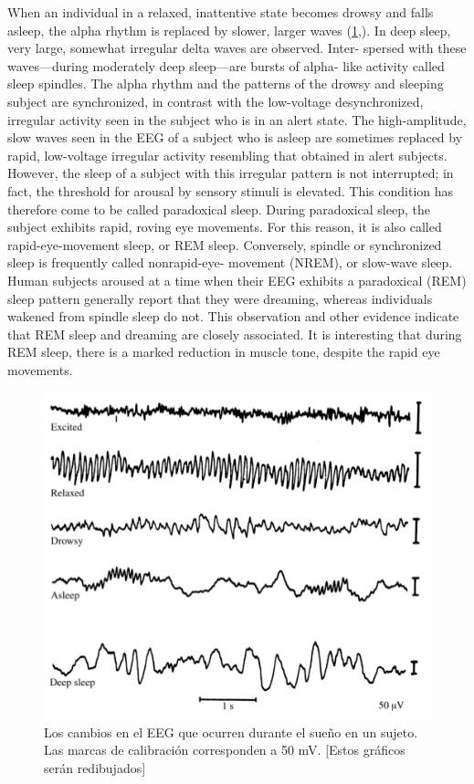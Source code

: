 
When an individual in a relaxed, inattentive state becomes drowsy and falls
asleep, the alpha rhythm is replaced by slower, larger waves 
(\ref{ritmosEEG},\cite{Jasper42}). In
deep sleep, very large, somewhat irregular delta waves are observed. Inter-
spersed with these waves—during moderately deep sleep—are bursts of alpha-
like activity called sleep spindles. The alpha rhythm and the patterns of the
drowsy and sleeping subject are synchronized, in contrast with the low-voltage
desynchronized, irregular activity seen in the subject who is in an alert state.
The high-amplitude, slow waves seen in the EEG of a subject who is asleep
are sometimes replaced by rapid, low-voltage irregular activity resembling that
obtained in alert subjects. However, the sleep of a subject with this irregular
pattern is not interrupted; in fact, the threshold for arousal by sensory stimuli is
elevated. This condition has therefore come to be called paradoxical sleep.
During paradoxical sleep, the subject exhibits rapid, roving eye movements.
For this reason, it is also called rapid-eye-movement sleep, or REM sleep.
Conversely, spindle or synchronized sleep is frequently called nonrapid-eye-
movement (NREM), or slow-wave sleep. Human subjects aroused at a time
when their EEG exhibits a paradoxical (REM) sleep pattern generally report
that they were dreaming, whereas individuals wakened from spindle sleep do
not. This observation and other evidence indicate that REM sleep and
dreaming are closely associated. It is interesting that during REM sleep, there
is a marked reduction in muscle tone, despite the rapid eye movements.

\begin{figure}
\centering
\includegraphics[width=0.7\linewidth]{figura_7.png} 
\caption{Los cambios en el EEG que ocurren durante el sue\~no en un sujeto.
Las marcas de calibraci\'on corresponden a 50 mV.
[Estos gr\'aficos ser\'an redibujados]
}
\label{ritmosEEG}
\end{figure}

